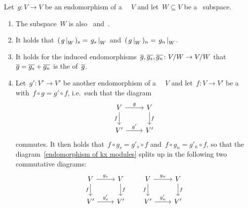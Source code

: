 \begin{lemma}
  \label{properties of jcd}
  Let~$g \colon V \to V$ be an endomorphism of a {\fd}~{\kvs}~$V$ and let~$W \subseteq V$ be a~ subspace.
  \begin{enumerate}
    \item
      The subspace~$W$ is also~ and~.
    \item
      \label{restriction of jcd}
      It holds that~$(\restrict*{g}{W})_s = \restrict*{g_s}{W}$ and~$(\restrict*{g}{W})_n = \restrict*{g_n}{W}$.
    \item
      \label{induced jcd}
      It holds for the induced endomorphisms~$\overline{g}, \overline{g_s}, \overline{g_n} \colon V/W \to V/W$ that~$\overline{g} = \overline{g_s} + \overline{g_n}$ is the {\JCD} of~$\overline{g}$.
    \item
      Let~$g' \colon V' \to V'$ be another endomorphism of a {\fd}~{\kvs}~$V$ and let~$f \colon V \to V'$ be a~ with~$f \circ g = g' \circ f$, i.e.\ such that the diagram
      \begin{equation}
        \label{endomorphism of kx modules}
        \begin{tikzcd}
            V
            \arrow{r}[above]{g}
            \arrow{d}[left]{f}
          & V
            \arrow{d}[right]{f}
          \\
            V'
            \arrow{r}[above]{g'}
          & V'
        \end{tikzcd}
      \end{equation}
      commutes.
      It then holds that~$f \circ g_s = g'_s \circ f$ and~$f \circ g_n = g'_n \circ f$, so that the diagram~\eqref{endomorphism of kx modules} splits up in the following two commutative diagrams:
      \[
        \begin{tikzcd}
            V
            \arrow{r}[above]{g_s}
            \arrow{d}[left]{f}
          & V
            \arrow{d}[right]{f}
          \\
            V'
            \arrow{r}[above]{g'_s}
          & V'
        \end{tikzcd}
        \qquad
        \begin{tikzcd}
            V
            \arrow{r}[above]{g_n}
            \arrow{d}[left]{f}
          & V
            \arrow{d}[right]{f}
          \\
            V'
            \arrow{r}[above]{g'_n}
          & V'
        \end{tikzcd}
      \]
  \end{enumerate}
\end{lemma}


